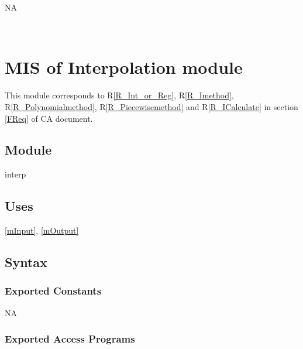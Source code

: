 \documentclass[12pt, titlepage]{article}
\begin{document}
NA




~\newpage

\section{MIS of Interpolation module} \label{mInterp}

This module corresponds to R\ref{R_Int_or_Reg}, R\ref{R_Imethod}, 
R\ref{R_Polynomialmethod}, R\ref{R_Piecewisemethod} and R\ref{R_ICalculate}
in section \ref{FReq} of CA document.


\subsection{Module}

interp

\subsection{Uses}

\ref{mInput}, \ref{mOutput} 


\subsection{Syntax}

\subsubsection{Exported Constants}


NA

\subsubsection{Exported Access Programs}
\end{document}

